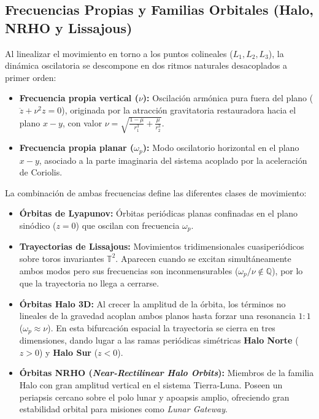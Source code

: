 \documentclass[11pt, a4paper]{article}
\begin{document}
	\subsection{Frecuencias Propias y Familias Orbitales (Halo, NRHO y Lissajous)}
	Al linealizar el movimiento en torno a los puntos colineales ($L_1, L_2, L_3$), la dinámica oscilatoria se descompone en dos ritmos naturales desacoplados a primer orden:
	\begin{itemize}[leftmargin=*]
		\item \textbf{Frecuencia propia vertical ($\nu$):} Oscilación armónica pura fuera del plano ($\ddot{z} + \nu^2 z = 0$), originada por la atracción gravitatoria restauradora hacia el plano $x-y$, con valor $\nu = \sqrt{\frac{1-\mu}{r_1^3} + \frac{\mu}{r_2^3}}$.
		\item \textbf{Frecuencia propia planar ($\omega_p$):} Modo oscilatorio horizontal en el plano $x-y$, asociado a la parte imaginaria del sistema acoplado por la aceleración de Coriolis.
	\end{itemize}
	La combinación de ambas frecuencias define las diferentes clases de movimiento:
	\begin{itemize}[leftmargin=*]
		\item \textbf{Órbitas de Lyapunov:} Órbitas periódicas planas confinadas en el plano sinódico ($z = 0$) que oscilan con frecuencia $\omega_p$.
		\item \textbf{Trayectorias de Lissajous:} Movimientos tridimensionales cuasiperiódicos sobre toros invariantes $\mathbb{T}^2$. Aparecen cuando se excitan simultáneamente ambos modos pero sus frecuencias son inconmensurables ($\omega_p / \nu \notin \mathbb{Q}$), por lo que la trayectoria no llega a cerrarse.
		\item \textbf{Órbitas Halo 3D:} Al crecer la amplitud de la órbita, los términos no lineales de la gravedad acoplan ambos planos hasta forzar una resonancia $1:1$ ($\omega_p \approx \nu$). En esta bifurcación espacial la trayectoria se cierra en tres dimensiones, dando lugar a las ramas periódicas simétricas \textbf{Halo Norte} ($z > 0$) y \textbf{Halo Sur} ($z < 0$).
		\item \textbf{Órbitas NRHO (\textit{Near-Rectilinear Halo Orbits}):} Miembros de la familia Halo con gran amplitud vertical en el sistema Tierra-Luna. Poseen un periapsis cercano sobre el polo lunar y apoapsis amplio, ofreciendo gran estabilidad orbital para misiones como \textit{Lunar Gateway}.
	\end{itemize}
	
\end{document}
